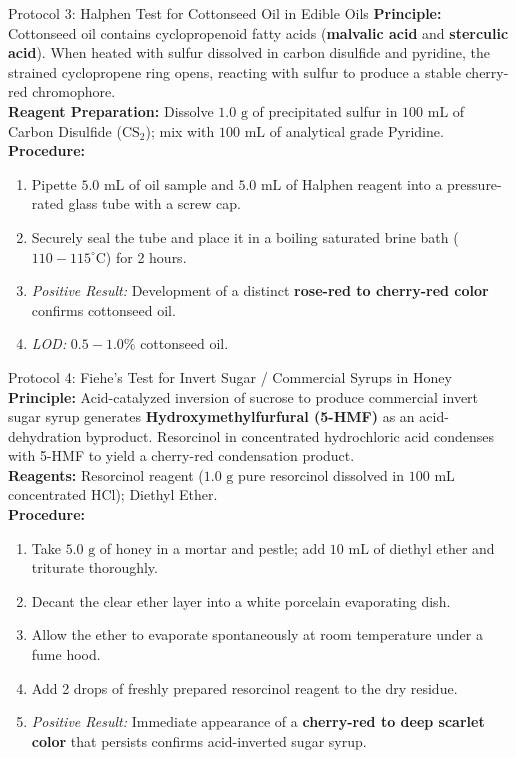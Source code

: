 \documentclass[11pt,a4paper,oneside]{article}
\begin{document}
\begin{protocolbox}{Protocol 3: Halphen Test for Cottonseed Oil in Edible Oils}
\textbf{Principle:} Cottonseed oil contains cyclopropenoid fatty acids (\textbf{malvalic acid} and \textbf{sterculic acid}). When heated with sulfur dissolved in carbon disulfide and pyridine, the strained cyclopropene ring opens, reacting with sulfur to produce a stable cherry-red chromophore.\\
\textbf{Reagent Preparation:} Dissolve $1.0\text{ g}$ of precipitated sulfur in $100\text{ mL}$ of Carbon Disulfide ($\mathrm{CS_2}$); mix with $100\text{ mL}$ of analytical grade Pyridine.\\
\textbf{Procedure:}
\begin{enumerate}
    \item Pipette $5.0\text{ mL}$ of oil sample and $5.0\text{ mL}$ of Halphen reagent into a pressure-rated glass tube with a screw cap.
    \item Securely seal the tube and place it in a boiling saturated brine bath ($110-115^\circ\text{C}$) for 2 hours.
    \item \textit{Positive Result:} Development of a distinct \textbf{rose-red to cherry-red color} confirms cottonseed oil.
    \item \textit{LOD:} $0.5-1.0\%$ cottonseed oil.
\end{enumerate}
\end{protocolbox}

\begin{protocolbox}{Protocol 4: Fiehe's Test for Invert Sugar / Commercial Syrups in Honey}
\textbf{Principle:} Acid-catalyzed inversion of sucrose to produce commercial invert sugar syrup generates \textbf{Hydroxymethylfurfural (5-HMF)} as an acid-dehydration byproduct. Resorcinol in concentrated hydrochloric acid condenses with 5-HMF to yield a cherry-red condensation product.\\
\textbf{Reagents:} Resorcinol reagent ($1.0\text{ g}$ pure resorcinol dissolved in $100\text{ mL}$ concentrated $\mathrm{HCl}$); Diethyl Ether.\\
\textbf{Procedure:}
\begin{enumerate}
    \item Take $5.0\text{ g}$ of honey in a mortar and pestle; add $10\text{ mL}$ of diethyl ether and triturate thoroughly.
    \item Decant the clear ether layer into a white porcelain evaporating dish.
    \item Allow the ether to evaporate spontaneously at room temperature under a fume hood.
    \item Add 2 drops of freshly prepared resorcinol reagent to the dry residue.
    \item \textit{Positive Result:} Immediate appearance of a \textbf{cherry-red to deep scarlet color} that persists confirms acid-inverted sugar syrup.
\end{enumerate}
\end{protocolbox}
\end{document}
